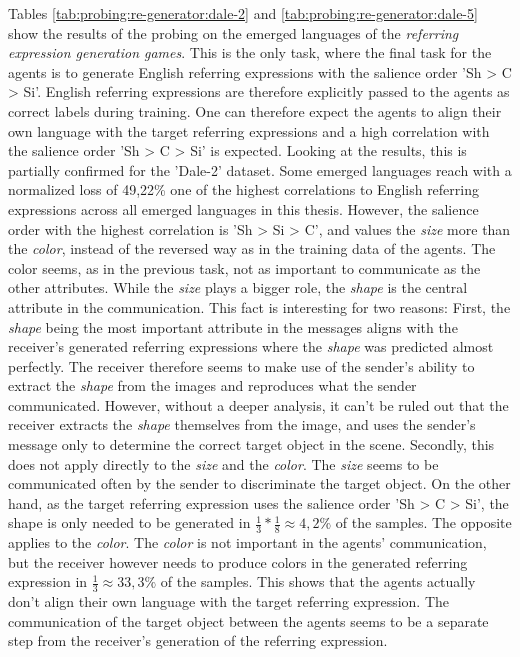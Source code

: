 Tables \ref{tab:probing:re-generator:dale-2} and \ref{tab:probing:re-generator:dale-5} show the results of the probing on the emerged languages of the \emph{referring expression generation games}.
This is the only task, where the final task for the agents is to generate English referring expressions with the salience order 'Sh > C > Si'.
English referring expressions are therefore explicitly passed to the agents as correct labels during training.
One can therefore expect the agents to align their own language with the target referring expressions and a high correlation with the salience order 'Sh > C > Si' is expected.
Looking at the results, this is partially confirmed for the 'Dale-2' dataset.
Some emerged languages reach with a normalized loss of 49,22\% one of the highest correlations to English referring expressions across all emerged languages in this thesis.
However, the salience order with the highest correlation is 'Sh > Si > C', and values the \emph{size} more than the \emph{color}, instead of the reversed way as in the training data of the agents.
The color seems, as in the previous task, not as important to communicate as the other attributes.
While the \emph{size} plays a bigger role, the \emph{shape} is the central attribute in the communication.
This fact is interesting for two reasons:
First, the \emph{shape} being the most important attribute in the messages aligns with the receiver's generated referring expressions where the \emph{shape} was predicted almost perfectly.
The receiver therefore seems to make use of the sender's ability to extract the \emph{shape} from the images and reproduces what the sender communicated.
However, without a deeper analysis, it can't be ruled out that the receiver extracts the \emph{shape} themselves from the image, and uses the sender's message only to determine the correct target object in the scene.
Secondly, this does not apply directly to the \emph{size} and the \emph{color}.
The \emph{size} seems to be communicated often by the sender to discriminate the target object.
On the other hand, as the target referring expression uses the salience order 'Sh > C > Si', the shape is only needed to be generated in $\frac{1}{3} * \frac{1}{8} \approx 4,2\%$ of the samples.
The opposite applies to the \emph{color}.
The \emph{color} is not important in the agents' communication, but the receiver however needs to produce colors in the generated referring expression in $\frac{1}{3} \approx 33,3\%$ of the samples.
This shows that the agents actually don't align their own language with the target referring expression.
The communication of the target object between the agents seems to be a separate step from the receiver's generation of the referring expression.

